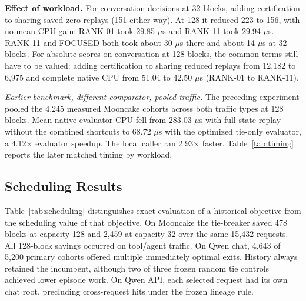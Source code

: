 \documentclass[11pt,letterpaper]{article}
\begin{document}
\textbf{Effect of workload.} For conversation decisions at 32 blocks, adding certification to sharing saved zero replays (151 either way). At 128 it reduced 223 to 156, with no mean CPU gain: RANK-01 took 29.85 \ensuremath{\mu}s and RANK-11 took 29.94 \ensuremath{\mu}s. RANK-11 and FOCUSED both took about 30 \ensuremath{\mu}s there and about 14 \ensuremath{\mu}s at 32 blocks. For absolute scores on conversation at 128 blocks, the common terms still have to be valued: adding certification to sharing reduced replays from 12,182 to 6,975 and complete native CPU from 51.04 to 42.50 \ensuremath{\mu}s (RANK-01 to RANK-11).

\textit{Earlier benchmark, different comparator, pooled traffic.} The preceding experiment pooled the 4,245 measured Mooncake cohorts across both traffic types at 128 blocks. Mean native evaluator CPU fell from 283.03 \ensuremath{\mu}s with full-state replay without the combined shortcuts to 68.72 \ensuremath{\mu}s with the optimized tie-only evaluator, a 4.12\ensuremath{\times} evaluator speedup. The local caller ran 2.93\ensuremath{\times} faster. Table~\ref{tab:timing} reports the later matched timing by workload.

\subsection{Scheduling Results}\label{sec:policy}

Table~\ref{tab:scheduling} distinguishes exact evaluation of a historical objective from the scheduling value of that objective. On Mooncake the tie-breaker saved 478 blocks at capacity 128 and 2,459 at capacity 32 over the same 15,432 requests. All 128-block savings occurred on tool/agent traffic. On Qwen chat, 4,643 of 5,200 primary cohorts offered multiple immediately optimal exits. History always retained the incumbent, although two of three frozen random tie controls achieved lower episode work. On Qwen API, each selected request had its own chat root, precluding cross-request hits under the frozen lineage rule.
\end{document}
